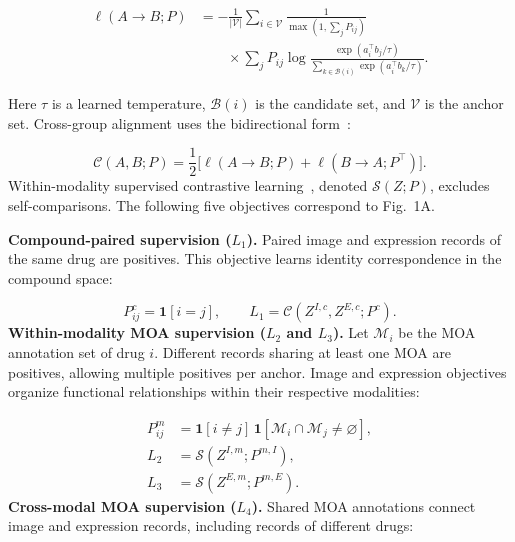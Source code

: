 \begin{equation}
\begin{aligned}
\ell(A\!\to\!B;P)
&=-\frac{1}{|\mathcal V|}
\sum_{i\in\mathcal V}\frac{1}{\max(1,\sum_jP_{ij})}\\[3pt]
&\qquad{}\times\sum_j P_{ij}
\log\frac{\exp(a_i^\top b_j/\tau)}
{\sum_{k\in\mathcal B(i)}\exp(a_i^\top b_k/\tau)}.
\end{aligned}
\label{eq:contrastive}
\end{equation}

Here $\tau$ is a learned temperature, $\mathcal B(i)$ is the candidate set, and $\mathcal V$ is the anchor set. Cross-group alignment uses the bidirectional form~\cite{radford2021}:

\begin{equation}
\mathcal C(A,B;P)=\frac12
\bigl[\ell(A\to B;P)+\ell(B\to A;P^\top)\bigr].
\label{eq:bidirectional}
\end{equation}
Within-modality supervised contrastive learning~\cite{khosla2020}, denoted $\mathcal S(Z;P)$, excludes self-comparisons. The following five objectives correspond to Fig.~1A.

\textbf{Compound-paired supervision ($L_1$).}
Paired image and expression records of the same drug are positives. This objective learns identity correspondence in the compound space:

\begin{equation}
P^c_{ij}=\mathbf1[i=j],
\qquad L_1=\mathcal C(Z^{I,c},Z^{E,c};P^c).
\label{eq:compound-pair}
\end{equation}
\textbf{Within-modality MOA supervision ($L_2$ and $L_3$).}
Let $\mathcal M_i$ be the MOA annotation set of drug $i$. Different records sharing at least one MOA are positives, allowing multiple positives per anchor. Image and expression objectives organize functional relationships within their respective modalities:

\begin{equation}
\begin{aligned}
P^m_{ij}&=\mathbf1[i\ne j]\,
          \mathbf1[\mathcal M_i\cap\mathcal M_j\ne\varnothing],\\[3pt]
L_2&=\mathcal S(Z^{I,m};P^{m,I}),\\[3pt]
L_3&=\mathcal S(Z^{E,m};P^{m,E}).
\end{aligned}
\label{eq:within-moa}
\end{equation}
\textbf{Cross-modal MOA supervision ($L_4$).}
Shared MOA annotations connect image and expression records, including records of different drugs:

